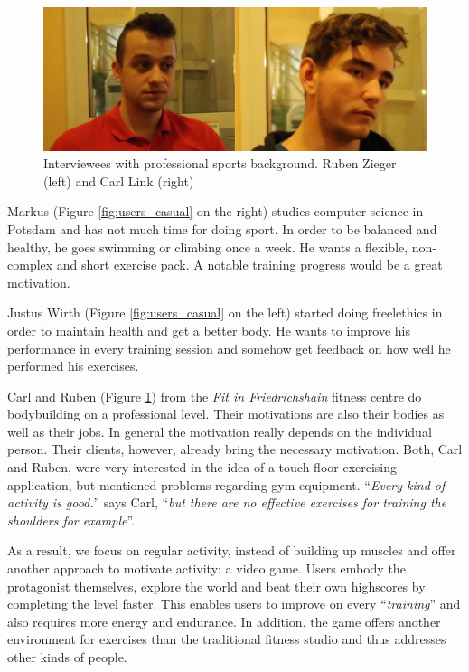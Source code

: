 \documentclass{sigchi}
\begin{document}
    \begin{figure}[ht]
      \centering
      \includegraphics[width=\columnwidth]{users_pro}
      \caption{Interviewees with professional sports background. Ruben Zieger (left) and Carl Link (right)}
      \label{fig:users_pro}
    \end{figure}

    Markus (Figure \ref{fig:users_casual} on the right) studies computer science in Potsdam and has not much time for doing sport. In order to be balanced and healthy, he goes swimming or climbing once a week. He wants a flexible, non-complex and short exercise pack. A notable training progress would be a great motivation.

    Justus Wirth (Figure \ref{fig:users_casual} on the left) started doing freelethics in order to maintain health and get a better body. He wants to improve his performance in every training session and somehow get feedback on how well he performed his exercises.

    Carl and Ruben (Figure \ref{fig:users_pro}) from the \emph{Fit in Friedrichshain} fitness centre do bodybuilding on a professional level. Their motivations are also their bodies as well as their jobs. In general the motivation really depends on the individual person. Their clients, however, already bring the necessary motivation. Both, Carl and Ruben, were very interested in the idea of a touch floor exercising application, but mentioned problems regarding gym equipment. ``\emph{Every kind of activity is good.}'' says Carl, ``\emph{but there are no effective exercises for training the shoulders for example}''. 

    As a result, we focus on regular activity, instead of building up muscles and offer another approach to motivate activity: a video game. Users embody the protagonist themselves, explore the world and beat their own highscores by completing the level faster. This enables users to improve on every ``\emph{training}'' and also requires more energy and endurance. In addition, the game offers another environment for exercises than the traditional fitness studio and thus addresses other kinds of people.
\end{document}
